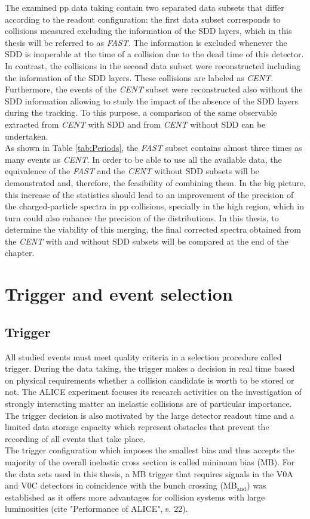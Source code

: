 \documentclass[12pt,a4paper]{report}
\begin{document}
The examined pp data taking contain two separated data subsets that differ according to the readout configuration: the first data subset corresponds to collisions measured excluding the information of the SDD layers, which in this thesis will be referred to as \textit{FAST}. The information is excluded whenever the SDD is inoperable at the time of a collision due to the dead time of this detector. In contrast, the collisions in the second data subset were reconstructed including the information of the SDD layers. These collisions are labeled as \textit{CENT}. Furthermore, the events of the \textit{CENT} subset were reconstructed also without the SDD information allowing to study the impact of the absence of the SDD layers during the tracking. To this purpose, a comparison of the same observable extracted from \textit{CENT} with SDD and from \textit{CENT} without SDD can be undertaken. \\
As shown in Table \ref{tab:Periods}, the \textit{FAST} subset contains almost three times as many events as \textit{CENT}. In order to be able to use all the available data, the equivalence of the \textit{FAST} and the \textit{CENT} without SDD subsets will be demonstrated and, therefore, the feasibility of combining them. In the big picture, this increase of the statistics should lead to an improvement of the precision of the charged-particle \pt spectra in pp collisions, specially in the high \pt region, which in turn could also enhance the precision of the \raa distributions. In this thesis, to determine the viability of this merging, the final corrected \pt spectra obtained from the \textit{CENT} with and without SDD subsets will be compared at the end of the chapter.

\section{Trigger and event selection}
\subsection{Trigger}
All studied events must meet quality criteria in a selection procedure called trigger. During the data taking, the trigger makes a decision in real time based on physical requirements whether a collision candidate is worth to be stored or not. The ALICE experiment focuses its research activities on the investigation of strongly interacting matter an inelastic collisions are of particular importance. The trigger decision is also motivated by the large detector readout time and a limited data storage capacity which represent obstacles that prevent the recording of all events that take place. \\
The trigger configuration which imposes the smallest bias and thus accepts the majority of the overall inelastic cross section is called minimum bias (MB). For the data sets used in this thesis, a MB trigger that requires signals in the V0A and V0C detectors in coincidence with the bunch crossing (MB$_\text{and}$) was established as it offers more advantages for collision systems with large luminosities (cite "Performance of ALICE", s. 22).
\end{document}
